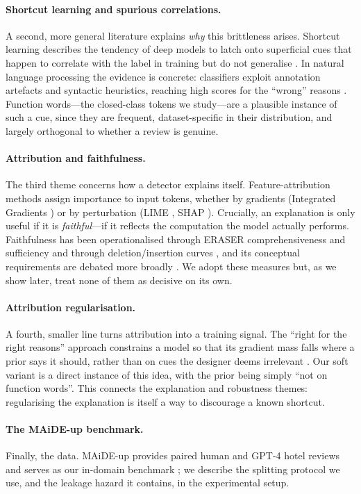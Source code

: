 \documentclass[10pt,twocolumn]{article}
\begin{document}
\paragraph{Shortcut learning and spurious correlations.}
A second, more general literature explains \emph{why} this brittleness arises. Shortcut learning describes the tendency of deep models to latch onto superficial cues that happen to correlate with the label in training but do not generalise \cite{geirhos}. In natural language processing the evidence is concrete: classifiers exploit annotation artefacts and syntactic heuristics, reaching high scores for the ``wrong'' reasons \cite{gururangan,mccoy}. Function words---the closed-class tokens we study---are a plausible instance of such a cue, since they are frequent, dataset-specific in their distribution, and largely orthogonal to whether a review is genuine.

\paragraph{Attribution and faithfulness.}
The third theme concerns how a detector explains itself. Feature-attribution methods assign importance to input tokens, whether by gradients (Integrated Gradients \cite{ig}) or by perturbation (LIME \cite{lime}, SHAP \cite{shap}). Crucially, an explanation is only useful if it is \emph{faithful}---if it reflects the computation the model actually performs. Faithfulness has been operationalised through ERASER comprehensiveness and sufficiency \cite{eraser} and through deletion/insertion curves \cite{rise}, and its conceptual requirements are debated more broadly \cite{jacovi}. We adopt these measures but, as we show later, treat none of them as decisive on its own.

\paragraph{Attribution regularisation.}
A fourth, smaller line turns attribution into a training signal. The ``right for the right reasons'' approach constrains a model so that its gradient mass falls where a prior says it should, rather than on cues the designer deems irrelevant \cite{ross}. Our soft variant is a direct instance of this idea, with the prior being simply ``not on function words''. This connects the explanation and robustness themes: regularising the explanation is itself a way to discourage a known shortcut.

\paragraph{The MAiDE-up benchmark.}
Finally, the data. MAiDE-up provides paired human and GPT-4 hotel reviews and serves as our in-domain benchmark \cite{maideup}; we describe the splitting protocol we use, and the leakage hazard it contains, in the experimental setup.
\end{document}
